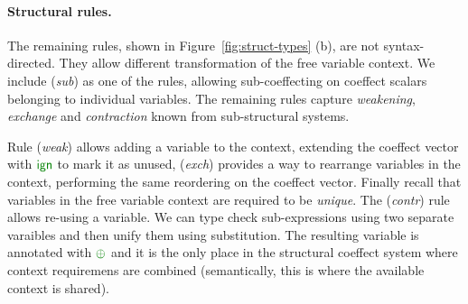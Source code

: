 \paragraph{Structural rules.}
The remaining rules, shown in Figure~\ref{fig:struct-types} (b), are not syntax-directed.
They allow different transformation of the free variable context. We include (\emph{sub}) 
as one of the rules, allowing sub-coeffecting on coeffect scalars belonging to individual 
variables. The remaining rules capture \emph{weakening}, \emph{exchange} and \emph{contraction} 
known from sub-structural systems.

Rule (\emph{weak}) allows adding a variable to the context, extending the coeffect
vector with $\czero$ to mark it as unused, (\emph{exch}) provides a way to rearrange variables
in the context, performing the same reordering on the coeffect vector. Finally recall that 
variables in the free variable context are required to be \emph{unique}. The (\emph{contr}) rule 
allows re-using a variable. We can type check sub-expressions using two separate varaibles and 
then unify them using substitution. The resulting variable is annotated with $\cpar$ and it
is the only place in the structural coeffect system where context requiremens are combined
(semantically, this is where the available context is shared).


